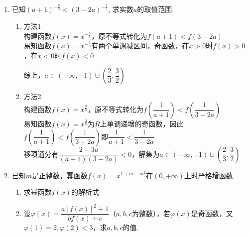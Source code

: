 \begin{enumerate}
\begin{enumerate}
\begin{jieda}
            由幂函数概念可知$m^2-m-1 = 1$，解得$m = -1 \mbox{或} 2$，又因为$f(x)$在$(0, +\infty)$为增函数，所以有$-5m-3 > 0$，因此$m = -1$
        \end{jieda}
        \item 已知$(a+1)^{-\frac{3}{5}}<(3-2a)^{-\frac{3}{5}}$, 求实数$a$的取值范围. 
        \begin{jieda}
        \begin{enumerate}
            \item 方法1 \\
            构建函数$f(x) = x^{-\frac{3}{5}}$，原不等式转化为$f(a+1) < f(3-2a)$ \\
            易知函数$f(x) = x^{-\frac{3}{5}}$有两个单调减区间，奇函数，在$x > 0$时$f(x) > 0$，在$x < 0$时$f(x) < 0$ 
            综上，$a \in (-\infty, -1) \cup \left(\dfrac{2}{3}, \dfrac{3}{2}\right)$
            \item 方法2 \\
            构建函数$f(x) = x^{\frac{3}{5}}$，原不等式转化为$f\left(\dfrac{1}{a+1}\right) < f\left(\dfrac{1}{3-2a}\right)$ \\
            易知函数$f(x) = x^{\frac{3}{5}}$为$R$上单调递增的奇函数，因此$f\left(\dfrac{1}{a+1}\right) < f\left(\dfrac{1}{3-2a}\right)$即$\dfrac{1}{a+1} < \dfrac{1}{3-2a}$ \\
            移项通分有$\dfrac{2-3a}{(a+1)(3-2a)} < 0$，解集为$a \in (-\infty, -1) \cup \left(\dfrac{2}{3}, \dfrac{3}{2}\right)$
        \end{enumerate}
        \end{jieda}
        \item 已知$m$是正整数，幂函数$f(x) = x^{1+m-m^2}$在$(0, +\infty)$上时严格增函数.
        \begin{enumerate}
            \item 求幂函数$f(x)$的解析式
            \item 设$\varphi(x) = \dfrac{a[f(x)]^2+1}{bf(x)+c}$（$a, b, c$为整数），若$\varphi(x)$是奇函数，又$\varphi(1) = 2, \varphi(2) < 3$，求$a, b, c$的值.

\end{enumerate}
\end{enumerate}
\end{enumerate}
